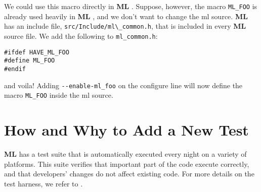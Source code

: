 \documentclass[10pt,letter,relax]{SANDreport}
\newcommand{\ML}     {{\bf ML }}
\begin{document}
We could use this macro directly in \ML.
Suppose, however, the macro \verb!ML_FOO! is already used
heavily in \ML, and we don't want to change the ml source.
\ML has an include file, \verb!src/Include/ml\_common.h!, that is included in
every \ML source file.
We add the following to \verb!ml_common.h!:
\begin{verbatim}
#ifdef HAVE_ML_FOO
#define ML_FOO
#endif
\end{verbatim}
and voila!   Adding \verb!--enable-ml_foo! on the configure line will now define the
macro \verb!ML_FOO! inside the ml source.


\section{How and Why to Add a New Test}
\label{sec:add_test}

\ML has a test suite that is automatically
executed every night on a variety of platforms.
This suite verifies
that important part of the code execute correctly, and
that developers' changes do not affect existing code.  For more details
on the test harness, we refer to \cite[Section 3.3]{Trilinos-Dev-Guide}.
\end{document}
